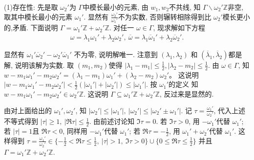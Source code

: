 \begin{itemize}
    (1)存在性: 先是取 $\omega_2'$为 $\Gamma$中模长最小的元素, 
    由 $w_1,w_2$不共线, 知 $\Gamma \backslash \omega_2' \mathbb{Z}$非空, 
    取其中模长最小的元素 $\omega_1'$. 显然有 $\frac{\omega_2'}{\omega_1'}$不为实数, 
    否则辗转相除得到比 $\omega_2'$模长更小的,矛盾. 
    下面说明 $\Gamma= \omega_1' \mathbb{Z}+\omega_2' \mathbb{Z}$. 
    对任一 $\omega \in \Gamma$, 现求解如下方程
    \begin{align*}
        \omega = \lambda_1 \omega_1' +\lambda_2 \omega_2',\ \overline{\omega} 
        = \lambda_1 \overline{\omega}_1' +\lambda_2 \overline{\omega}_2' .
    \end{align*}
    
    显然有 $\omega_1' \overline{\omega}_2' - \omega_2' \overline{\omega}_1'$
    不为零, 说明解唯一. 注意到  $(\lambda_1,\lambda_2)$
    和 $(\overline{\lambda}_1,\overline{\lambda}_2)$都是解, 说明该解为实数. 
    取 $(m_1,m_2)$使得 $|\lambda_1-m_1|\le \frac{1}{2}, |\lambda_2-m_2|
    \le \frac{1}{2}$. 由 $\omega \in \Gamma$, 知 $w-m_1 \omega_1'-m_2 \omega_2' 
    = (\lambda_1-m_1) \omega_1'+  (\lambda_2-m_2) \omega_2'$。 
    这说明$|w-m_1 \omega_1'-m_2 \omega_2'|< \frac{1}{2}(| \omega_1'|+|\omega_2'|)
    \le |\omega_1'|$. 按 $\omega_1'$的定义 知 
    $w-m_1 \omega_1'-m_2 \omega_2' \in \omega_2' \mathbb{Z}$. 
    这说明 $\Gamma \subseteq  \omega_1' \mathbb{Z}+\omega_2' \mathbb{Z}$, 
    反过来是显然的.

    由对上面给出的 $\omega_1',\omega_2'$, 
    知 $|\omega_2'|\le |\omega_1'|,\ |\omega_2'|\le |\omega_2'\pm \omega_1'|$. 
    记 $\tau = \frac{\omega_1'}{\omega_2'}$, 代入上述不等式得到 
    $|\tau|\ge 1,\ |\Re\tau|\le \frac{1}{2}$. 由前述讨论知 $\Im\tau = 0$. 
    若 $\Im\tau>0$, 用 $-\omega_1'$代替 $\omega_1'$;  
    若 $|\tau|=1$且 $\Re\tau<0$, 同样用 $-\omega_1'$代替 $\omega_1'$;
    若  $\Re\tau = -\frac{1}{2} $, 用 $\omega_1'+\omega_2'$代替 $\omega_1'$. 
    这样得到 $\tau = \frac{\omega_1'}{\omega_2'} \in \{-\frac{1}{2}
    <\Re\tau\le \frac{1}{2},\ |\tau|> 1,\ \Im\tau>0\}
    \cup \{0\le \Re\tau\le \frac{1}{2}\}$
    并且 $\Gamma =  \omega_1' \mathbb{Z}+\omega_2' \mathbb{Z}$.


\end{itemize}
